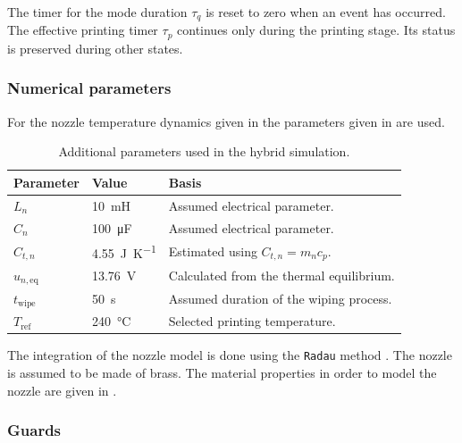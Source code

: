 \documentclass[a4paper,11pt]{article}
\begin{document}
The timer for the mode duration $\tau_q$ is reset to zero when an event has occurred. The effective printing timer $\tau_p$ continues only during the printing stage. Its status is preserved during other states.

\subsubsection{Numerical parameters}

For the nozzle temperature dynamics given in  the parameters given in  are used.

\begin{table}[htbp]
    \centering
    \caption{Additional parameters used in the hybrid simulation.}
    \label{tab:parameter}
    \small
    \begin{tabularx}{0.8\linewidth}{
        @{}
        l
        l
        >{\raggedright\arraybackslash}X
        @{}
    }
        \toprule
        \textbf{Parameter} & \textbf{Value} & \textbf{Basis} \\
        \midrule
        $L_n$
            & \SI{10}{\milli\henry}
            & Assumed electrical parameter. \\
        $C_n$
            & \SI{100}{\micro\farad}
            & Assumed electrical parameter. \\
        $C_{t,n}$
            & \SI{4.55}{\joule\per\kelvin}
            & Estimated using $C_{t,n}=m_n c_p$. \\
        $u_{n,\mathrm{eq}}$
            & \SI{13.76}{\volt}
            & Calculated from the thermal equilibrium. \\
        $t_{\mathrm{wipe}}$
            & \SI{50}{\second}
            & Assumed duration of the wiping process. \\
        $T_{\mathrm{ref}}$
            & \SI{240}{\degreeCelsius}
            & Selected printing temperature. \\
        \bottomrule
    \end{tabularx}
\end{table}

The integration of the nozzle model is done using the \texttt{Radau} method \cite{scipyRadaux2014}. The nozzle is assumed to be made of brass. The material properties in order to model the nozzle are given in \cite{brass}.

\subsubsection{Guards}
\end{document}
